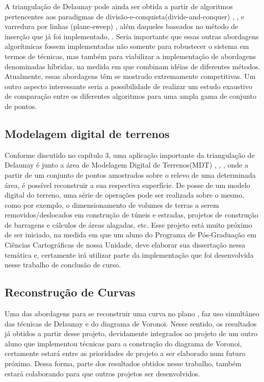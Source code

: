\documentclass[12pt,a4paper]{book}
\begin{document}
A triangula\c{c}\~{a}o de Delaunay pode ainda ser obtida a partir de algoritmos pertencentes aos paradigmas de divis\~ao-e-conquista(divide-and-conquer) \cite{dwyer}, \cite{guibas}, \cite{lee} e varredura por linhas (plane-sweep) \cite{fortune}, al\'em daqueles baseados no m\'etodo de inser\c{c}\~{a}o que j\'a foi implementado\cite{guibas}, \cite{boissonnat}.
Seria importante que essas outras abordagens algor\'itmicas fossem implementadas n\~ao somente para robustecer o sistema em termos de t\'ecnicas, mas tamb\'em para viabilizar a implementa\c{c}\~{a}o de abordagens denominadas h\'ibridas, na medida em que combinam id\'eias de diferentes m\'etodos. Atualmente, essas abordagens t\^em se mostrado extremamente competitivas. Um outro aspecto interessante seria a possibilidade de realizar um estudo exaustivo de compara\c{c}\~{a}o entre os diferentes algoritmos para uma ampla gama de conjunto de pontos.

\subsection{Modelagem digital de terrenos}

Conforme discutido no cap\'itulo 3, uma aplica\c{c}\~{a}o importante da triangula\c{c}\~{a}o de Delaunay \'e junto a \'area de Modelagem Digital de Terrenos(MDT) \cite{el-sheimy}, \cite{snook}, \cite{li}, \cite{hjelle} onde a partir de um conjunto de pontos amostrados sobre o relevo de uma determinada \'area, \'e poss\'ivel reconstruir a sua respectiva superf\'icie. De posse de um modelo digital do terreno, uma s\'erie de opera\c{c}\~{o}es pode ser realizada sobre o mesmo, como por exemplo, o dimensionamento de volumes de terras a serem removidos/deslocados em constru\c{c}\~{a}o de t\'uneis e estradas, projetos de constru\c{c}\~{a}o de barragens e c\'alculos de \'areas alagadas, etc.
Esse projeto est\'a muito pr\'oximo de ser iniciado, na medida em que um aluno do Programa de P\'os-Gradua\c{c}\~{a}o em Ci\^encias Cartogr\'aficas de nossa Unidade, deve elaborar sua disserta\c{c}\~{a}o nessa tem\'atica e, certamente ir\'a utilizar parte da implementa\c{c}\~{a}o que foi desenvolvida nesse trabalho de conclus\~ao de curso. 

\subsection{Reconstru\c{c}\~{a}o de Curvas}

Uma das abordagens para se reconstruir uma curva no plano \cite{dey}, faz uso simult\^aneo das t\'ecnicas de Delaunay e do diagrama de Voronoi. Nesse sentido, os resultados j\'a obtidos a partir desse projeto, devidamente integrados ao projeto de um outro aluno que implementou t\'ecnicas para a constru\c{c}\~{a}o do diagrama de Voronoi, certamente estar\'a entre as prioridades de projeto a ser elaborado num futuro pr\'oximo. Dessa forma, parte dos resultados obtidos nesse trabalho, tamb\'em estar\'a colaborando para que outros projetos ser desenvolvidos.
\end{document}
